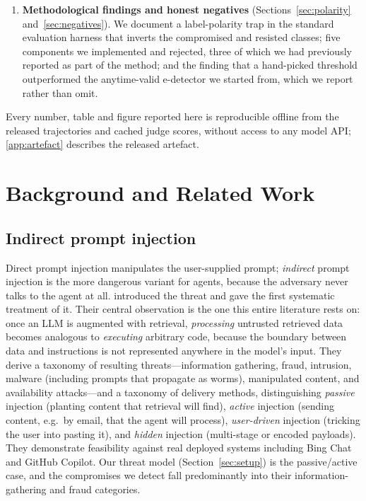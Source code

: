 \documentclass[preprint,12pt,authoryear]{elsarticle}
\theoremstyle{definition}
\begin{document}
\begin{enumerate}
\item \textbf{Methodological findings and honest negatives}
(Sections~\ref{sec:polarity} and~\ref{sec:negatives}). We document a
label-polarity trap in the standard evaluation harness that inverts the
compromised and resisted classes; five components we implemented and rejected,
three of which we had previously reported as part of the method; and the finding
that a hand-picked threshold outperformed the anytime-valid e-detector we
started from, which we report rather than omit.
\end{enumerate}

Every number, table and figure reported here is reproducible offline from the
released trajectories and cached judge scores, without access to any model API;
\ref{app:artefact} describes the released artefact.

\section{Background and Related Work}\label{sec:related}

\subsection{Indirect prompt injection}

Direct prompt injection manipulates the user-supplied prompt; \emph{indirect}
prompt injection is the more dangerous variant for agents, because the adversary
never talks to the agent at all. \citet{greshake2023notwhat} introduced the
threat and gave the first systematic treatment of it. Their central observation
is the one this entire literature rests on: once an LLM is augmented with
retrieval, \emph{processing} untrusted retrieved data becomes analogous to
\emph{executing} arbitrary code, because the boundary between data and
instructions is not represented anywhere in the model's input. They derive a
taxonomy of resulting threats---information gathering, fraud, intrusion, malware
(including prompts that propagate as worms), manipulated content, and
availability attacks---and a taxonomy of delivery methods, distinguishing
\emph{passive} injection (planting content that retrieval will find),
\emph{active} injection (sending content, e.g.\ by email, that the agent will
process), \emph{user-driven} injection (tricking the user into pasting it), and
\emph{hidden} injection (multi-stage or encoded payloads). They demonstrate
feasibility against real deployed systems including Bing Chat and GitHub Copilot.
Our threat model (Section~\ref{sec:setup}) is the passive/active case, and the
compromises we detect fall predominantly into their information-gathering and
fraud categories.
\end{document}
